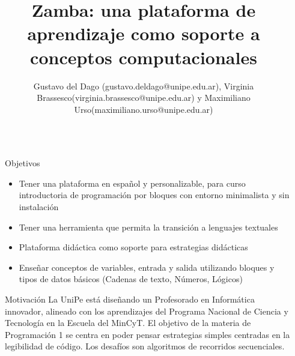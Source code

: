 \documentclass[final]{beamer}
\title{Zamba: una plataforma de aprendizaje como soporte a conceptos computacionales} %
\author{Gustavo del Dago (gustavo.deldago@unipe.edu.ar), Virginia Brassesco(virginia.brassesco@unipe.edu.ar) y Maximiliano Urso(maximiliano.urso@unipe.edu.ar)}
\institute{Universidad Pedagógica Nacional} %
\newlength{\sepwid}
\newlength{\twocolwid}
\begin{document}

\setlength{\belowcaptionskip}{2ex} %
\setlength\belowdisplayshortskip{2ex} %

\begin{frame}[t] %

\begin{columns}[t] %

\begin{column}{\sepwid}\end{column} %

\begin{column}{\twocolwid} %


\begin{alertblock}{Objetivos}
    \begin{itemize}
        \item Tener una plataforma en español y personalizable, para curso introductoria de programación por bloques con entorno minimalista y sin instalación
        \item Tener una herramienta que permita la transición a lenguajes textuales
        \item Plataforma didáctica como soporte para estrategias didácticas
        \item Enseñar conceptos de  variables, entrada y salida utilizando bloques y tipos de datos básicos (Cadenas de texto, Números, Lógicos)
    \end{itemize}
\end{alertblock}


\begin{block}{Motivación}
    La UniPe está diseñando un Profesorado en Informática innovador, alineado con los aprendizajes del Programa Nacional de Ciencia y Tecnología en la Escuela del MinCyT.
    El objetivo de la materia de Programación 1 se centra en poder pensar estrategias simples centradas en la legibilidad de código. 
    Los desafíos son algoritmos de recorridos secuenciales.
\end{block}


\end{column}
\end{columns}
\end{frame}
\end{document}
